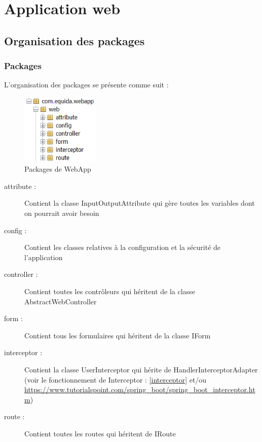\chapter{Application web}

	\section{Organisation des packages}

		\subsection{Packages}


			L'organisation des packages se présente comme suit :

			\begin{figure}[H]
				\centering\includegraphics[width=0.33\textwidth, keepaspectratio]{res/package.png}
				\caption{Packages de WebApp}
			\end{figure}

			\begin{description}
				\item[attribute :]{Contient la classe InputOutputAttribute qui gère toutes les variables dont on pourrait avoir besoin}
				\item[config :]{Contient les classes relatives à la configuration et la sécurité de l'application}
				\item[controller :]{Contient toutes les contrôleurs qui héritent de la classe AbstractWebController}
				\item[form :]{Contient tous les formulaires qui héritent de la classe IForm}
				\item[interceptor :]{Contient la classe UserInterceptor qui hérite de HandlerInterceptorAdapter (voir le fonctionnement de Interceptor : \ref{interceptor} et/ou \url{https://www.tutorialspoint.com/spring_boot/spring_boot_interceptor.htm})}
				\item[route :]{Contient toutes les routes qui héritent de IRoute}
			\end{description}

